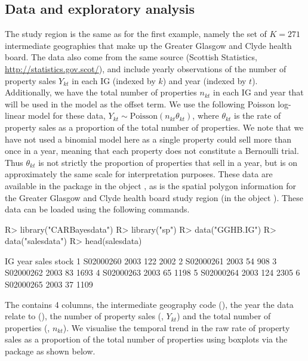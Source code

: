 \documentclass[article, nojss]{jss}
\begin{document}
\subsection{Data and exploratory analysis}
The study region is the same as for the first example, namely the set of $K=271$ intermediate geographies that make up the Greater Glasgow and Clyde health board. The data also come from the same source (Scottish Statistics, \url{http://statistics.gov.scot/}), and include yearly observations of the number of property sales $Y_{kt}$ in each IG (indexed by $k$) and year (indexed by $t$). Additionally,  we have the total number of properties $n_{kt}$ in each IG and year that will be used in the model as the offset term. We use the following Poisson log-linear model for these data, $Y_{kt}\sim\mbox{Poisson}(n_{kt}\theta_{kt})$, where $\theta_{kt}$ is the rate of property sales as a proportion of the total number of properties. We note that we have not used a binomial model here as a single property could sell more than once in a year, meaning that each property does not constitute a Bernoulli trial. Thus $\theta_{kt}$ is not strictly the proportion of properties that sell in a year, but is on approximately the same scale for interpretation purposes. These data are available in the  package in the object , as is the spatial polygon information for the Greater Glasgow and Clyde health board study region (in the object ). These data can be loaded using the following commands.



\begin{Schunk}
\begin{Sinput}
R>  library("CARBayesdata")
R>  library("sp")
R>  data("GGHB.IG")
R>  data("salesdata")
R>  head(salesdata)
\end{Sinput}
\begin{Soutput}
         IG year sales stock
1 S02000260 2003   122  2002
2 S02000261 2003    54   908
3 S02000262 2003    83  1693
4 S02000263 2003    65  1198
5 S02000264 2003   124  2305
6 S02000265 2003    37  1109
\end{Soutput}
\end{Schunk}


The   contains 4 columns, the intermediate geography code (), the year the data relate to (), the number of property sales (, $Y_{kt}$) and the total number of properties (, $n_{kt}$). We visualise the temporal trend in the raw rate of property sales as a proportion of the total number of properties using boxplots via the  package as shown below.
\end{document}
